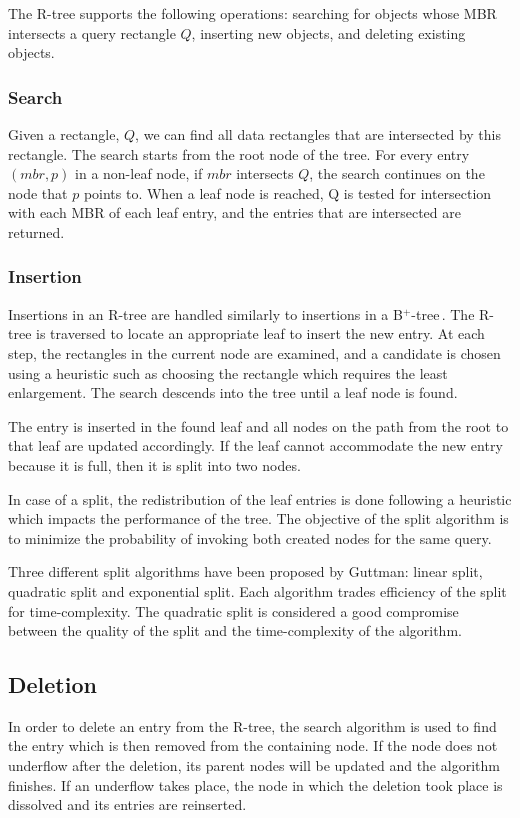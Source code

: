 \documentclass[11pt, a4paper, oneside]{article}
\newcommand{\bplus}{B$^+$-tree$\,$}
\begin{document}
The R-tree supports the following operations: searching for objects whose MBR intersects a query rectangle $Q$, inserting new objects, and deleting existing objects.

\subsubsection*{Search}
Given a rectangle, $Q$, we can find all data rectangles that are intersected by this rectangle. The search starts from the root node of the tree. For every entry $(mbr, p)$ in a non-leaf node, if $mbr$ intersects $Q$, the search continues on the node that $p$ points to. When a leaf node is reached, Q is tested for intersection with each MBR of each leaf entry, and the entries that are intersected are returned.

\subsubsection*{Insertion}
Insertions in an R-tree are handled similarly to insertions in a \bplus. The R-tree is traversed to locate an appropriate leaf to insert the new entry. At each step, the rectangles in the current node are examined, and a candidate is chosen using a heuristic such as choosing the rectangle which requires the least enlargement. The search descends into the tree until a leaf node is found.

The entry is inserted in the found leaf and all nodes on the path from the root to that leaf are updated accordingly. If the leaf cannot accommodate the new entry because it is full, then it is split into two nodes.

In case of a split, the redistribution of the leaf entries is done following a heuristic which impacts the performance of the tree. The objective of the split algorithm is to minimize the probability of invoking both created nodes for the same query. 

Three different split algorithms have been proposed by Guttman: linear split, quadratic split and exponential split. Each algorithm trades efficiency of the split for time-complexity. The quadratic split is considered a good compromise between the quality of the split and the time-complexity of the algorithm.

\subsection*{Deletion}
In order to delete an entry from the R-tree, the search algorithm is used to find the entry which is then removed from the containing node. If the node does not underflow after the deletion, its parent nodes will be updated and the algorithm finishes. If an underflow takes place, the node in which the deletion took place is dissolved and its entries are reinserted.
\end{document}
